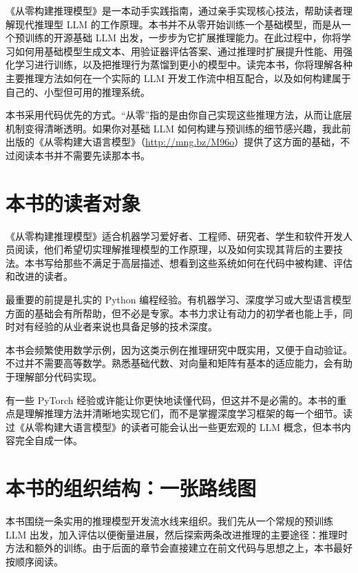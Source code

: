 《从零构建推理模型》是一本动手实践指南，通过亲手实现核心技法，帮助读者理解现代推理型 LLM 的工作原理。本书并不从零开始训练一个基础模型，而是从一个预训练的开源基础 LLM 出发，一步步为它扩展推理能力。在此过程中，你将学习如何用基础模型生成文本、用验证器评估答案、通过推理时扩展提升性能、用强化学习进行训练，以及把推理行为蒸馏到更小的模型中。读完本书，你将理解各种主要推理方法如何在一个实际的 LLM 开发工作流中相互配合，以及如何构建属于自己的、小型但可用的推理系统。

本书采用代码优先的方式。“从零”指的是由你自己实现这些推理方法，从而让底层机制变得清晰透明。如果你对基础 LLM 如何构建与预训练的细节感兴趣，我此前出版的《从零构建大语言模型》（\href{http://mng.bz/M96o}{http://mng.bz/M96o}）提供了这方面的基础，不过阅读本书并不需要先读那本书。

\section*{本书的读者对象}

《从零构建推理模型》适合机器学习爱好者、工程师、研究者、学生和软件开发人员阅读，他们希望切实理解推理模型的工作原理，以及如何实现其背后的主要技法。本书写给那些不满足于高层描述、想看到这些系统如何在代码中被构建、评估和改进的读者。

最重要的前提是扎实的 Python 编程经验。有机器学习、深度学习或大型语言模型方面的基础会有所帮助，但不必是专家。本书力求让有动力的初学者也能上手，同时对有经验的从业者来说也具备足够的技术深度。

本书会频繁使用数学示例，因为这类示例在推理研究中既实用，又便于自动验证。不过并不需要高等数学。熟悉基础代数、对向量和矩阵有基本的适应能力，会有助于理解部分代码实现。

有一些 PyTorch 经验或许能让你更快地读懂代码，但这并不是必需的。本书的重点是理解推理方法并清晰地实现它们，而不是掌握深度学习框架的每一个细节。读过《从零构建大语言模型》的读者可能会认出一些更宏观的 LLM 概念，但本书内容完全自成一体。

\section*{本书的组织结构：一张路线图}

本书围绕一条实用的推理模型开发流水线来组织。我们先从一个常规的预训练 LLM 出发，加入评估以便衡量进展，然后探索两条改进推理的主要途径：推理时方法和额外的训练。由于后面的章节会直接建立在前文代码与思想之上，本书最好按顺序阅读。

